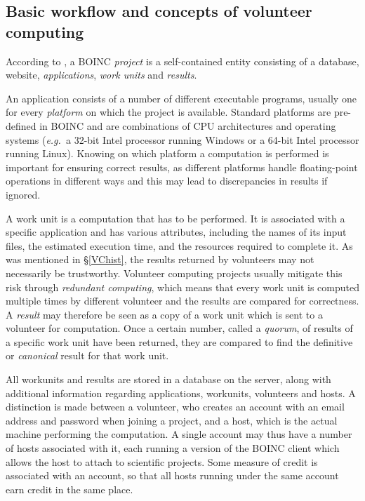  \subsection{Basic workflow and concepts of volunteer computing} \label{Bconcepts}
According to \cite{boincwiki}, a BOINC \emph{project} is a self-contained entity consisting of a  database, website, \emph{applications}, \emph{work units} and \emph{results}.

An application consists of a number of different executable programs, usually one for every \emph{platform} on which the project is  available. Standard platforms are pre-defined in BOINC and are   combinations of CPU architectures and operating systems (\emph{e.g.\ }a 32-bit Intel processor running Windows or a 64-bit Intel processor running Linux). Knowing on which platform a computation is performed  is important for ensuring correct results, as different platforms handle floating-point operations in different ways and this may lead to discrepancies in results if ignored.

A work unit is a computation that has to be performed. It is associated with a specific application and has various attributes, including the names of its input files, the estimated execution time, and the resources required to complete it. As was mentioned in \S\ref{VChist},   the results returned by volunteers may not necessarily be trustworthy. Volunteer computing projects usually mitigate this risk through \emph{redundant computing}, which means that every work unit is computed multiple times by different volunteer and the results are compared for correctness. A \emph{result} may therefore be seen as a copy of a work unit which is sent to a volunteer for computation.  Once a certain number, called a \emph{quorum}, of results of a specific work unit have been returned, they are compared to find the definitive or \emph{canonical} result for that work unit.


All workunits and results are stored in a database on the server, along with additional information regarding applications, workunits, volunteers and hosts. A distinction is made between a volunteer, who creates an account with an email address and password when joining a project, and a host, which is the actual machine performing the computation. A single account may thus have a number of hosts associated with it, each running a version of the BOINC client which allows the host to attach to scientific projects. Some measure of credit is associated with an account, so that all hosts running under the same account earn credit in the same place.

